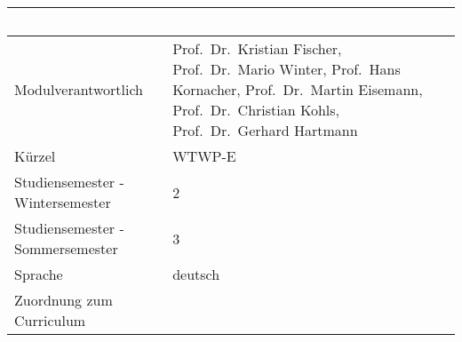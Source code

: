 \begin{longtable}[]{@{}ll@{}}
\toprule
\begin{minipage}[b]{0.12\columnwidth}\raggedright\strut
~\strut
\end{minipage} & \begin{minipage}[b]{0.12\columnwidth}\raggedright\strut
~\strut
\end{minipage}\tabularnewline
\midrule
\endhead
\begin{minipage}[t]{0.12\columnwidth}\raggedright\strut
Modulverantwortlich\strut
\end{minipage} & \begin{minipage}[t]{0.12\columnwidth}\raggedright\strut
Prof.~Dr.~Kristian Fischer, Prof.~Dr.~Mario Winter, Prof.~Hans
Kornacher, Prof.~Dr.~Martin Eisemann, Prof.~Dr.~Christian Kohls,
Prof.~Dr.~Gerhard Hartmann\strut
\end{minipage}\tabularnewline
\begin{minipage}[t]{0.12\columnwidth}\raggedright\strut
Kürzel\strut
\end{minipage} & \begin{minipage}[t]{0.12\columnwidth}\raggedright\strut
WTWP-E\strut
\end{minipage}\tabularnewline
\begin{minipage}[t]{0.12\columnwidth}\raggedright\strut
Studiensemester - Wintersemester\strut
\end{minipage} & \begin{minipage}[t]{0.12\columnwidth}\raggedright\strut
2\strut
\end{minipage}\tabularnewline
\begin{minipage}[t]{0.12\columnwidth}\raggedright\strut
Studiensemester - Sommersemester\strut
\end{minipage} & \begin{minipage}[t]{0.12\columnwidth}\raggedright\strut
3\strut
\end{minipage}\tabularnewline
\begin{minipage}[t]{0.12\columnwidth}\raggedright\strut
Sprache\strut
\end{minipage} & \begin{minipage}[t]{0.12\columnwidth}\raggedright\strut
deutsch\strut
\end{minipage}\tabularnewline
\begin{minipage}[t]{0.12\columnwidth}\raggedright\strut
Zuordnung zum Curriculum\strut
\end{minipage} & \begin{minipage}[t]{0.12\columnwidth}\raggedright\strut

\end{minipage}
\end{longtable}
